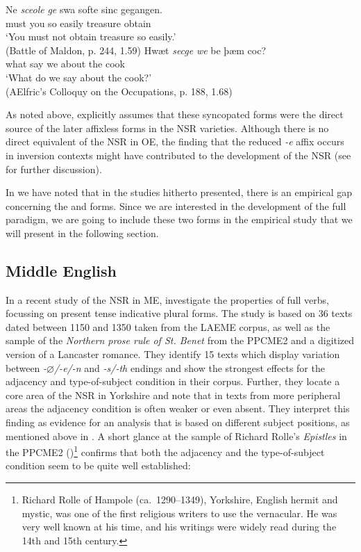 \documentclass[output=paper]{langsci/langscibook}
\begin{document}
\ea
\ea\label{exwege2}
\gll Ne \textit{sceole} \textit{ge} swa softe sinc gegangen.\\
\Neg{} must you so easily treasure obtain\\
\glt `You must not obtain treasure so easily.'\\
(Battle of Maldon, p. 244, 1.59)
\ex
\gll Hwæt \textit{secge} \textit{we} be  þæm coc?\\
what say we about the cook\\
\glt `What do we say about the cook?'\\
(AElfric's Colloquy on the Occupations, p. 188, 1.68)
\z
\z

As noted above, \citet{Rodeffer:1903} explicitly assumes that these syncopated
forms were the direct source of the later affixless forms in the \gls{NSR}
varieties. Although there is no direct equivalent of the \gls{NSR} in \gls{OE},
the finding that the reduced \emph{-e} affix occurs in inversion contexts might
have contributed to the development of the \gls{NSR} (see
 for further discussion).

In  we have noted that in the studies hitherto presented, there
is an empirical gap concerning the \Fsg{} and \Ssg{} forms.  Since we are
interested in the development of the full paradigm, we are going to include
these two forms in the empirical study that we will present in the following
section.

\subsection{Middle English}
\label{sec:me}

In a recent study of the \gls{NSR} in ME, \cite{deHaasandvanKemenade:2015}
investigate the  properties of full verbs, focussing on present tense
indicative plural forms. The study is based on 36 texts dated between 1150 and
1350 taken from the \nocite{LAEME} LAEME corpus, as well as the sample of the
\emph{Northern prose rule of St. Benet} from the PPCME2 and a digitized version
of a Lancaster romance. They identify 15 texts which display variation between
\emph{-$\varnothing$/-e/-n} and \emph{-s/-th} endings and show the strongest effects for
the adjacency and type-of-subject condition in their corpus. Further, they
locate a core area of the \gls{NSR} in Yorkshire and note that in texts from
more peripheral areas the adjacency condition is often weaker or even absent.
They interpret this finding as evidence for an analysis that is based on
different subject positions, as mentioned above in . A
short glance at the sample of Richard Rolle's \textit{Epistles} in the PPCME2
(\citealt{KroTay2000})\footnote{Richard Rolle of Hampole (ca.\ 1290--1349),
    Yorkshire, English hermit and mystic, was one of the first religious writers to
    use the vernacular. He was very well known at his time, and his writings were
widely read during the 14th and 15th century.} confirms that both the adjacency
and the type-of-subject condition seem to be quite well established:\largerpage
\end{document}
